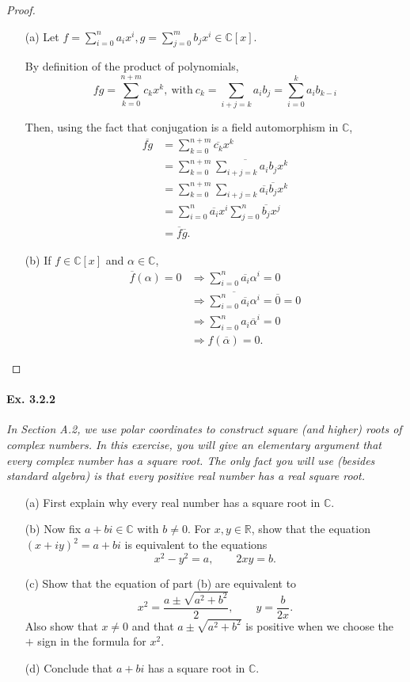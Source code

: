\documentclass[11pt,a4paper]{article}
\newcommand{\R}{\mathbb{R}}
\newcommand{\C}{\mathbb{C}}
\begin{document}
\begin{proof}
\begin{enumerate}
\item[(a)]
Let $f = \sum\limits_{i=0}^n{a_ix^i},  g = \sum\limits_{j=0}^m{b_jx^i} \in \mathbb{C}[x]$.

By definition of the product of polynomials,
$$fg = \sum_{k=0}^{n+m}c_kx^{k}, \ \mathrm{with} \ c_k =\sum_{i+j = k}a_ib_j = \sum_{i=0}^k a_i b_{k-i}$$


Then, using the fact that conjugation is a field automorphism in  $\mathbb{C}$,
\begin{align*}
\overline{fg} &= \sum_{k=0}^{n+m}\overline{c_k}x^{k}\\
&=\sum_{k=0}^{n+m}\overline{\sum_{i+j = k}a_ib_j} x^k\\
&=\sum_{k=0}^{n+m}\sum_{i+j = k}\overline{a_i} \overline{b_j} x^k\\
&=\sum\limits_{i=0}^n{\overline{a_i}x^i}  \sum\limits_{j=0}^n\overline{b_j}x^j\\
&=\overline{f} \overline{g}.
\end{align*}

\item[(b)] If $f \in \C[x]$ and $\alpha \in \C$,
\begin{align*}
\overline{f}(\alpha) = 0 &\Rightarrow \sum\limits_{i=0}^n\overline{a_i}\alpha^i= 0\\
&\Rightarrow \overline{\sum\limits_{i=0}^n\overline{a_i}\alpha^i} = \overline{0}=0\\
&\Rightarrow \sum\limits_{i=0}^n a_i \overline{\alpha}^i=0\\
&\Rightarrow f(\overline{\alpha}) = 0.
\end{align*}
\end{enumerate}
\end{proof}

\paragraph{Ex. 3.2.2}

{\it In Section A.2, we use polar coordinates to construct square (and higher) roots of complex numbers. In this exercise, you will give an elementary argument that every complex number has a square root. The only fact you will use (besides standard algebra) is that every positive real number has a real square root.
\begin{enumerate}
\item[(a)] First explain why every real number has a square root in $\C$.
\item[(b)] Now fix $a+bi \in \C$ with $b \ne 0$. For $x,y \in \R$, show that the equation $(x+iy)^2 = a+bi$ is equivalent to the equations
$$x^2-y^2 = a, \qquad 2xy = b.$$
\item[(c)] Show that the equation of part (b) are equivalent to
$$x^2 =\frac{a\pm \sqrt{a^2+b^2}}{2}, \qquad y = \frac{b}{2x}.$$
Also show that $x\ne 0$ and that $a\pm \sqrt{a^2+b^2}$ is positive when we choose the $+$ sign in the formula for $x^2$.
\item[(d)] Conclude that $a+bi$ has a square root in $\C$.
\end{enumerate}
}
\end{document}
